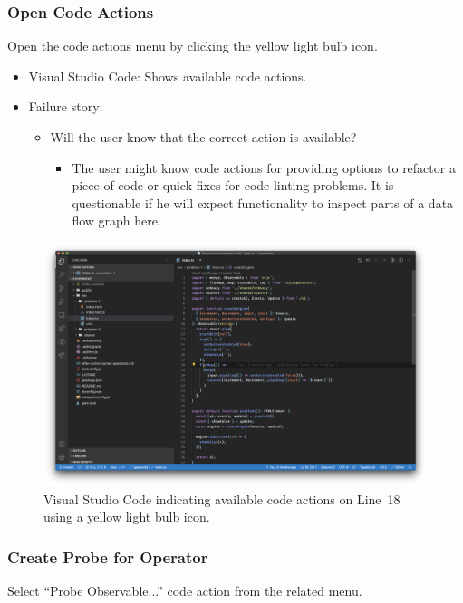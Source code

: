 \documentclass[sigplan,screen,nonacm,review]{acmart}
\begin{document}
\subsubsection{Open Code Actions}
Open the code actions menu by clicking the yellow light bulb icon.

\begin{itemize}
	\item Visual Studio Code: Shows available code actions.
	\item Failure story:
	      \begin{itemize}
	      	\item Will the user know that the correct action is available?
	      	      \begin{itemize}
	      	      	\item The user might know code actions for providing options to refactor a piece of code or quick fixes for code linting problems. It is questionable if he will expect functionality to inspect parts of a data flow graph here.
	      	      \end{itemize}
	      \end{itemize}
\end{itemize}

\begin{figure}[ht]
	\centering
	\includegraphics[width=\columnwidth]{walkthrough-screenshots/step3and4.png}
	\Description{}
	\caption{Visual Studio Code indicating available code actions on Line~18 using a yellow light bulb icon.}
	\label{fig:walkthrough-screesnhot-step-3}
\end{figure}


\subsubsection{Create Probe for Operator}
Select ``Probe Observable...'' code action from the related menu.
\end{document}
